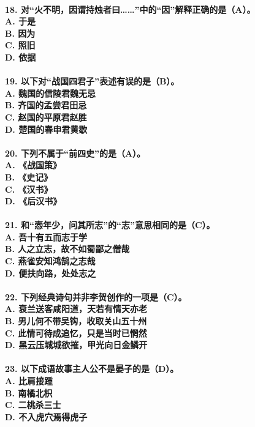 \documentclass[UTF8]{ctexart} %
\begin{document}
\paragraph{
18. 对“火不明，因谓持烛者曰……”中的“因”解释正确的是（\color{red}A\color{black}）。 \\
    A. 于是 \\
    B. 因为 \\
    C. 照旧 \\
    D. 依据
}
\paragraph{
19. 以下对“战国四君子”表述有误的是（\color{red}B\color{black}）。 \\
    A. 魏国的信陵君魏无忌 \\
    B. 齐国的孟尝君田忌 \\
    C. 赵国的平原君赵胜 \\
    D. 楚国的春申君黄歇
}
\paragraph{
20. 下列不属于“前四史”的是（\color{red}A\color{black}）。 \\
    A. 《战国策》 \\
    B. 《史记》 \\
    C. 《汉书》 \\
    D. 《后汉书》
}
\paragraph{
21. 和“悫年少，问其所志”的“志”意思相同的是（\color{red}C\color{black}）。 \\
    A. 吾十有五而志于学 \\
    B. 人之立志，故不如蜀鄙之僧哉 \\
    C. 燕雀安知鸿鹄之志哉 \\
    D. 便扶向路，处处志之
}
\paragraph{
22. 下列经典诗句并非李贺创作的一项是（\color{red}C\color{black}）。 \\
    A. 衰兰送客咸阳道，天若有情天亦老 \\
    B. 男儿何不带吴钩，收取关山五十州 \\
    C. 此情可待成追忆，只是当时已惘然 \\
    D. 黑云压城城欲摧，甲光向日金鳞开
}
\paragraph{
23. 以下成语故事主人公不是晏子的是（\color{red}D\color{black}）。 \\
    A. 比肩接踵 \\
    B. 南橘北枳 \\
    C. 二桃杀三士 \\
    D. 不入虎穴焉得虎子
}
\end{document}
